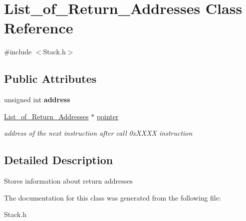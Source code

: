 \hypertarget{structList__of__Return__Addresses}{
\section{List\_\-of\_\-Return\_\-Addresses Class Reference}
\label{structList__of__Return__Addresses}
}


{\ttfamily \#include $<$Stack.h$>$}

\subsection*{Public Attributes}
\begin{DoxyCompactItemize}
\item 
\hypertarget{structList__of__Return__Addresses_a95a492f991784ee1bdee88132b649614}{
unsigned int {\bfseries address}}
\label{structList__of__Return__Addresses_a95a492f991784ee1bdee88132b649614}

\item 
\hypertarget{structList__of__Return__Addresses_a476949fa3ea312b5d54e8d9dc2d5dd73}{
\hyperlink{structList__of__Return__Addresses}{List\_\-of\_\-Return\_\-Addresses} $\ast$ \hyperlink{structList__of__Return__Addresses_a476949fa3ea312b5d54e8d9dc2d5dd73}{pointer}}
\label{structList__of__Return__Addresses_a476949fa3ea312b5d54e8d9dc2d5dd73}

\begin{DoxyCompactList}\small\item\em address of the next instruction after call 0xXXXX instruction \item\end{DoxyCompactList}\end{DoxyCompactItemize}


\subsection{Detailed Description}
Stores information about return addresses 

The documentation for this class was generated from the following file:\begin{DoxyCompactItemize}
\item 
Stack.h\end{DoxyCompactItemize}

